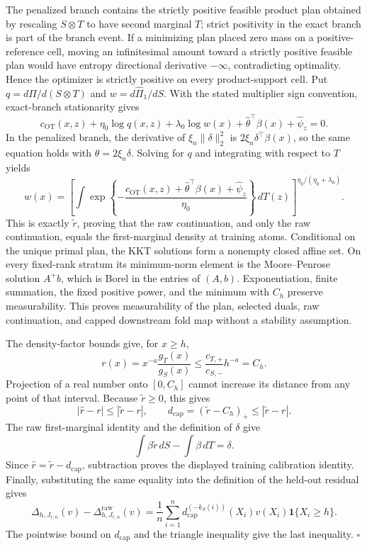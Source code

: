 The penalized branch contains the strictly positive feasible product plan obtained by rescaling \(S\otimes T\) to have second marginal \(T\); strict positivity in the exact branch is part of the branch event. If a minimizing plan placed zero mass on a positive-reference cell, moving an infinitesimal amount toward a strictly positive feasible plan would have entropy directional derivative \(-\infty\), contradicting optimality. Hence the optimizer is strictly positive on every product-support cell. Put \(q=d\widehat\Pi/d(S\otimes T)\) and \(w=d\widehat\Pi_1/dS\). With the stated multiplier sign convention, exact-branch stationarity gives
\[
c_{\mathrm{OT}}(x,z)+\eta_0\log q(x,z)+\lambda_0\log w(x)
+\widehat\theta^\top\beta(x)+\widehat\psi_z=0.
\]
In the penalized branch, the derivative of \(\xi_n\|\delta\|_2^2\) is \(2\xi_n\delta^\top\beta(x)\), so the same equation holds with \(\widehat\theta=2\xi_n\delta\). Solving for \(q\) and integrating with respect to \(T\) yields
\[
w(x)=\left[\int\exp\left\{-\frac{c_{\mathrm{OT}}(x,z)+\widehat\theta^\top\beta(x)+\widehat\psi_z}{\eta_0}\right\}\,dT(z)\right]^{\eta_0/(\eta_0+\lambda_0)}.
\]
This is exactly \(\widetilde r\), proving that the raw continuation, and only the raw continuation, equals the first-marginal density at training atoms. Conditional on the unique primal plan, the KKT solutions form a nonempty closed affine set. On every fixed-rank stratum its minimum-norm element is the Moore--Penrose solution \(A^+b\), which is Borel in the entries of \((A,b)\). Exponentiation, finite summation, the fixed positive power, and the minimum with \(C_h\) preserve measurability. This proves measurability of the plan, selected duals, raw continuation, and capped downstream fold map without a stability assumption.

The density-factor bounds give, for \(x\ge h\),
\[
r(x)=x^{-a}\frac{g_T(x)}{g_S(x)}
\le \frac{c_{T,+}}{c_{S,-}}h^{-a}=C_h.
\]
Projection of a real number onto \([0,C_h]\) cannot increase its distance from any point of that interval. Because \(\widetilde r\ge0\), this gives
\[
|\widehat r-r|\le|\widetilde r-r|,
\qquad
d_{\mathrm{cap}}=(\widetilde r-C_h)_+\le|\widetilde r-r|.
\]
The raw first-marginal identity and the definition of \(\delta\) give
\[
\int\beta\widetilde r\,dS-\int\beta\,dT=\delta.
\]
Since \(\widehat r=\widetilde r-d_{\mathrm{cap}}\), subtraction proves the displayed training calibration identity. Finally, substituting the same equality into the definition of the held-out residual gives
\[
\Delta_{h,J_{r,n}}(v)-\Delta^{\mathrm{raw}}_{h,J_{r,n}}(v)
=\frac1n\sum_{i=1}^n d_{\mathrm{cap}}^{(-k_S(i))}(X_i)v(X_i)\mathbf 1\{X_i\ge h\}.
\]
The pointwise bound on \(d_{\mathrm{cap}}\) and the triangle inequality give the last inequality. \(\square\)